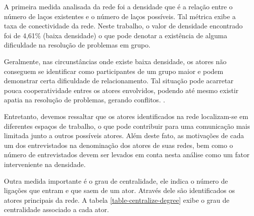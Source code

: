 A primeira medida analisada da rede foi a densidade que é a relação entre o número de laços existentes e o número de laços possíveis. Tal métrica exibe a taxa de conectividade da rede. Neste trabalho, o valor de densidade encontrado foi de 4,61\% (baixa densidade) o que pode denotar a existência de alguma dificuldade na resolução de problemas em grupo.

Geralmente, nas circunstâncias onde existe baixa densidade, os atores não conseguem se identificar como participantes de um grupo maior e podem demonstrar certa dificuldade de relacionamento. Tal situação pode acarretar pouca cooperatividade entres os atores envolvidos, podendo até mesmo existir apatia na resolução de problemas, gerando conflitos. \cite{hanneman2001centralidad}.

Entretanto, devemos ressaltar que os atores identificados na rede localizam-se em diferentes espaços de trabalho, o que pode contribuir para uma comunicação mais limitada junto a outros possíveis atores. Além deste fato, as motivações de cada um dos entrevistados na denominação dos atores de suas redes, bem como o número de entrevistados devem ser levados em conta nesta análise como um fator interveniente na densidade. 

Outra medida importante é o grau de centralidade, ele indica o número de ligações que entram e que saem de um ator. Através dele são identificados os atores principais da rede. A tabela \ref{table-centralize-degree} exibe o grau de centralidade associado a cada ator.

